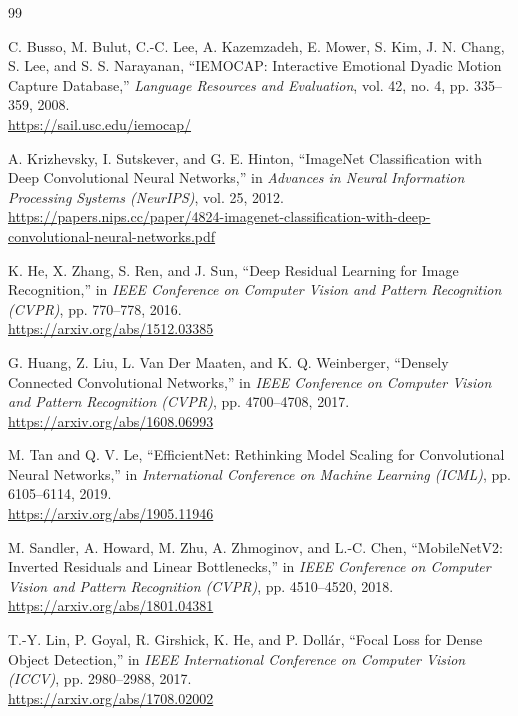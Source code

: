 \clearpage
{}
\label{chap:references}

\begin{thebibliography}{99}
\sloppy

C. Busso, M. Bulut, C.-C. Lee, A. Kazemzadeh, E. Mower, S. Kim, J. N. Chang, S. Lee, and S. S. Narayanan,
``IEMOCAP: Interactive Emotional Dyadic Motion Capture Database,''
\textit{Language Resources and Evaluation}, vol. 42, no. 4, pp. 335--359, 2008.
\\ \url{https://sail.usc.edu/iemocap/}

A. Krizhevsky, I. Sutskever, and G. E. Hinton,
``ImageNet Classification with Deep Convolutional Neural Networks,''
in \textit{Advances in Neural Information Processing Systems (NeurIPS)}, vol. 25, 2012.
\\ \url{https://papers.nips.cc/paper/4824-imagenet-classification-with-deep-convolutional-neural-networks.pdf}

K. He, X. Zhang, S. Ren, and J. Sun,
``Deep Residual Learning for Image Recognition,''
in \textit{IEEE Conference on Computer Vision and Pattern Recognition (CVPR)}, pp. 770--778, 2016.
\\ \url{https://arxiv.org/abs/1512.03385}

G. Huang, Z. Liu, L. Van Der Maaten, and K. Q. Weinberger,
``Densely Connected Convolutional Networks,''
in \textit{IEEE Conference on Computer Vision and Pattern Recognition (CVPR)}, pp. 4700--4708, 2017.
\\ \url{https://arxiv.org/abs/1608.06993}

M. Tan and Q. V. Le,
``EfficientNet: Rethinking Model Scaling for Convolutional Neural Networks,''
in \textit{International Conference on Machine Learning (ICML)}, pp. 6105--6114, 2019.
\\ \url{https://arxiv.org/abs/1905.11946}

M. Sandler, A. Howard, M. Zhu, A. Zhmoginov, and L.-C. Chen,
``MobileNetV2: Inverted Residuals and Linear Bottlenecks,''
in \textit{IEEE Conference on Computer Vision and Pattern Recognition (CVPR)}, pp. 4510--4520, 2018.
\\ \url{https://arxiv.org/abs/1801.04381}

T.-Y. Lin, P. Goyal, R. Girshick, K. He, and P. Doll\'{a}r,
``Focal Loss for Dense Object Detection,''
in \textit{IEEE International Conference on Computer Vision (ICCV)}, pp. 2980--2988, 2017.
\\ \url{https://arxiv.org/abs/1708.02002}


\end{thebibliography}
